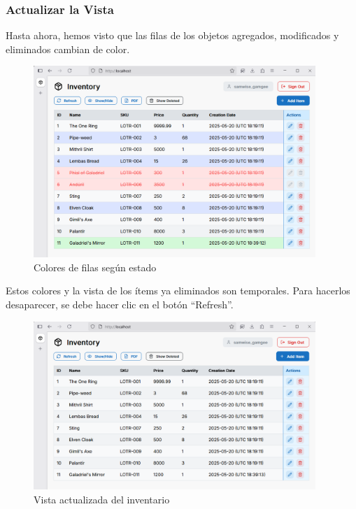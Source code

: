 \subsubsection{Actualizar la Vista}

Hasta ahora, hemos visto que las filas de los objetos agregados, modificados y eliminados cambian de color.

\begin{figure}[H]
    \centering
    \includegraphics[width=0.95\textwidth]{images/18 Colores}
    \caption{Colores de filas según estado}
\end{figure}

Estos colores y la vista de los ítems ya eliminados son temporales. Para hacerlos desaparecer, se debe hacer clic en el botón “Refresh”.

\begin{figure}[H]
    \centering
    \includegraphics[width=0.95\textwidth]{images/19 Actualizado}
    \caption{Vista actualizada del inventario}
\end{figure}

